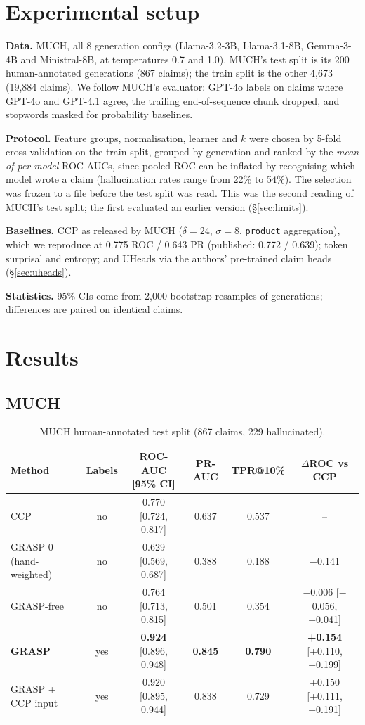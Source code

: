 \documentclass[11pt]{article}
\begin{document}
\section{Experimental setup}
\textbf{Data.} MUCH, all 8 generation configs (Llama-3.2-3B, Llama-3.1-8B, Gemma-3-4B and
Ministral-8B, at temperatures 0.7 and 1.0). MUCH's test split is its 200 human-annotated generations
(867 claims); the train split is the other 4,673 (19,884 claims). We follow MUCH's evaluator:
GPT-4o labels on claims where GPT-4o and GPT-4.1 agree, the trailing end-of-sequence chunk dropped,
and stopwords masked for probability baselines.

\textbf{Protocol.} Feature groups, normalisation, learner and $k$ were chosen by 5-fold
cross-validation on the train split, grouped by generation and ranked by the \emph{mean of
per-model} ROC-AUCs, since pooled ROC can be inflated by recognising which model wrote a claim
(hallucination rates range from 22\% to 54\%). The selection was frozen to a file before the test
split was read. This was the second reading of MUCH's test split; the first evaluated an earlier
version (\S\ref{sec:limits}).

\textbf{Baselines.} CCP as released by MUCH ($\delta{=}24$, $\sigma{=}8$, \texttt{product}
aggregation), which we reproduce at 0.775 ROC / 0.643 PR (published: 0.772 / 0.639); token
surprisal and entropy; and UHeads \citep{shelmanov-etal-2025-head} via the authors' pre-trained
claim heads (\S\ref{sec:uheads}).

\textbf{Statistics.} 95\% CIs come from 2,000 bootstrap resamples of generations; differences
are paired on identical claims.

\section{Results}
\subsection{MUCH}
\begin{table}[h]
\centering\small
\begin{tabular}{lccccc}
\toprule
Method & Labels & ROC-AUC [95\% CI] & PR-AUC & TPR@10\% & $\Delta$ROC vs CCP \\
\midrule
CCP & no & 0.770 [0.724, 0.817] & 0.637 & 0.537 & -- \\
GRASP-0 (hand-weighted) & no & 0.629 [0.569, 0.687] & 0.388 & 0.188 & $-$0.141 \\
GRASP-free & no & 0.764 [0.713, 0.815] & 0.501 & 0.354 & $-$0.006 [$-$0.056, +0.041] \\
\textbf{GRASP} & yes & \textbf{0.924} [0.896, 0.948] & \textbf{0.845} & \textbf{0.790} & \textbf{+0.154} [+0.110, +0.199] \\
GRASP + CCP input & yes & 0.920 [0.895, 0.944] & 0.838 & 0.729 & +0.150 [+0.111, +0.191] \\
\bottomrule
\end{tabular}
\caption{MUCH human-annotated test split (867 claims, 229 hallucinated).}
\label{tab:main}
\end{table}
\end{document}
